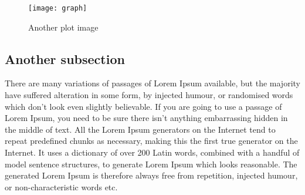 \begin{figure}[ht]
  \label{hourglass}
  \begin{center}
    \texttt{[image: graph]}
    \caption{Another plot image}
  \end{center}
\end{figure}

\subsection{Another subsection} 
There are many variations of passages of Lorem Ipsum available, but the majority have suffered alteration in some form, by injected humour, or randomised words which don't look even slightly believable. If you are going to use a passage of Lorem Ipsum, you need to be sure there isn't anything embarrassing hidden in the middle of text. All the Lorem Ipsum generators on the Internet tend to repeat predefined chunks as necessary, making this the first true generator on the Internet. It uses a dictionary of over 200 Latin words, combined with a handful of model sentence structures, to generate Lorem Ipsum which looks reasonable. The generated Lorem Ipsum is therefore always free from repetition, injected humour, or non-characteristic words etc.
